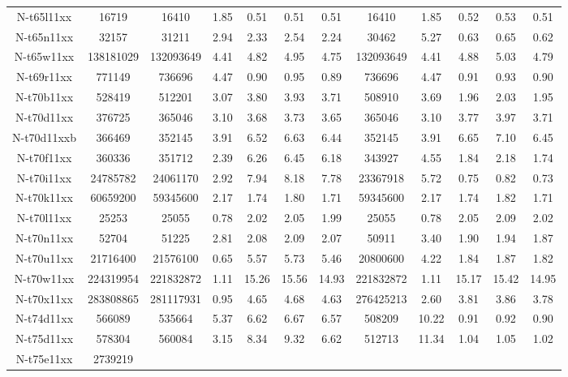\documentclass[a4paper,10pt,onecolumn]{article}
\begin{document}
{\begin{table}[htbp]
\begin{tabular}{|c|c|ccccc|ccccc|}
\\
    N-t65l11xx & 16719 &
16410 & 1.85 & 0.51   & 0.51  & 0.51 
&
16410 & 1.85 & 0.52   & 0.53  & 0.51 
\\
    N-t65n11xx & 32157 &
31211 & 2.94 & 2.33   & 2.54  & 2.24 
&
30462 & 5.27 & 0.63   & 0.65  & 0.62 
\\
    N-t65w11xx & 138181029 &
132093649 & 4.41 & 4.82   & 4.95  & 4.75 &
132093649 & 4.41 & 4.88   & 5.03  & 4.79 
\\
    N-t69r11xx & 771149 &
736696 & 4.47 & 0.90   & 0.95  & 0.89  &
736696 & 4.47 & 0.91   & 0.93  & 0.90 
\\
    N-t70b11xx & 528419 &
512201 & 3.07 & 3.80   & 3.93  & 3.71 &
508910 & 3.69 & 1.96   & 2.03  & 1.95 
\\
    N-t70d11xx & 376725 &
365046 & 3.10 & 3.68   & 3.73  & 3.65 &
365046 & 3.10 & 3.77   & 3.97  & 3.71 
\\
    N-t70d11xxb & 366469 &
352145 & 3.91 & 6.52   & 6.63  & 6.44 &
352145 & 3.91 & 6.65   & 7.10  & 6.45 
\\
    N-t70f11xx & 360336 &
351712 & 2.39 & 6.26   & 6.45  & 6.18 &
343927 & 4.55 & 1.84   & 2.18  & 1.74 
\\
N-t70i11xx & 24785782 &
24061170 & 2.92 & 7.94   & 8.18  & 7.78 
&
23367918 & 5.72 & 0.75   & 0.82  & 0.73 
\\
N-t70k11xx & 60659200 &
59345600 & 2.17 & 1.74   & 1.80  & 1.71 
&
59345600 & 2.17 & 1.74   & 1.82  & 1.71 
\\
N-t70l11xx & 25253 &
25055 & 0.78 & 2.02   & 2.05  & 1.99 
&
25055 & 0.78 & 2.05   & 2.09  & 2.02 
\\
N-t70n11xx & 52704 &
51225 & 2.81 & 2.08   & 2.09  & 2.07 
&
50911 & 3.40 & 1.90   & 1.94  & 1.87 
\\
N-t70u11xx & 21716400 &
21576100 & 0.65 & 5.57   & 5.73  & 5.46 
&
20800600 & 4.22 & 1.84   & 1.87  & 1.82 
\\
N-t70w11xx & 224319954 &
221832872 & 1.11 & 15.26   & 15.56  & 14.93 
&
221832872 & 1.11 & 15.17   & 15.42  & 14.95 
\\
N-t70x11xx & 283808865 &
281117931 & 0.95 & 4.65   & 4.68  & 4.63 
&
276425213 & 2.60 & 3.81   & 3.86  & 3.78 
\\
N-t74d11xx & 566089 &
535664 & 5.37 & 6.62   & 6.67  & 6.57 
&
508209 & 10.22 & 0.91   & 0.92  & 0.90 
\\
N-t75d11xx & 578304 &
560084 & 3.15 & 8.34   & 9.32  & 6.62 
&
512713 & 11.34 & 1.04   & 1.05  & 1.02 
\\
N-t75e11xx & 2739219 &

\end{tabular}
\end{table}}
\end{document}
